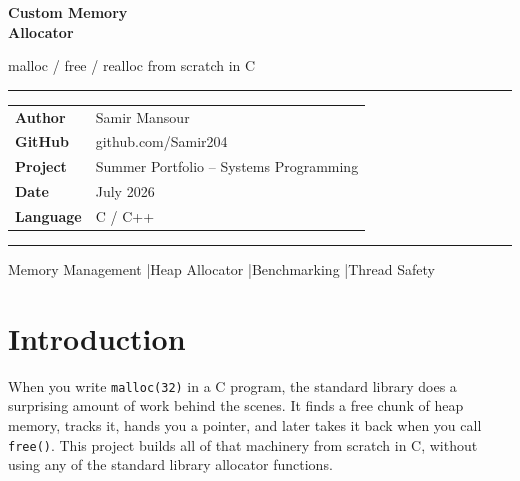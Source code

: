 \documentclass[12pt, a4paper]{report}
\begin{document}
\begin{titlepage}
  \pagecolor{accent}
  \color{white}
  \vspace*{3cm}

  {\fontsize{36}{44}\selectfont\bfseries Custom Memory\\[6pt] Allocator\par}

  \vspace{1cm}
  \color{white!80!accent}
  {\Large malloc / free / realloc from scratch in C\par}

  \vspace{0.6cm}
  \color{white}
  \rule{\linewidth}{0.5pt}
  \vspace{0.6cm}

  \begin{tabular}{ll}
    \textbf{Author}   & Samir Mansour \\[4pt]
    \textbf{GitHub}   & github.com/Samir204 \\[4pt]
    \textbf{Project}  & Summer Portfolio -- Systems Programming \\[4pt]
    \textbf{Date}     & July 2026 \\[4pt]
    \textbf{Language} & C / C++ \\
  \end{tabular}

  \vfill

  \color{white!60!accent}
  \rule{\linewidth}{0.5pt}
  \vspace{0.3cm}

  {\small Memory Management \quad|\quad Heap Allocator \quad|\quad Benchmarking \quad|\quad Thread Safety\par}
\end{titlepage}

\nopagecolor

\tableofcontents
\thispagestyle{empty}
\clearpage

\chapter{Introduction}

When you write \texttt{malloc(32)} in a C program, the standard library does a
surprising amount of work behind the scenes. It finds a free chunk of heap
memory, tracks it, hands you a pointer, and later takes it back when you call
\texttt{free()}. This project builds all of that machinery from scratch in C,
without using any of the standard library allocator functions.
\end{document}
